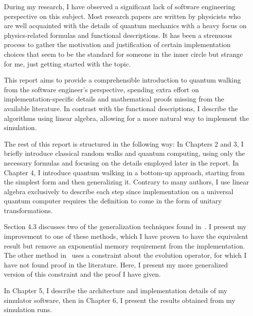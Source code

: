 During my research, I have observed a significant lack of software engineering perspective on this subject. Most research papers are written by physicists who are well acquainted with the details of quantum mechanics with a heavy focus on physics-related formulas and functional descriptions. It has been a strenuous process to gather the motivation and justification of certain implementation choices that seem to be the standard for someone in the inner circle but strange for me, just getting started with the topic.

This report aims to provide a comprehensible introduction to quantum walking from the software engineer's perspective, spending extra effort on implementation-specific details and mathematical proofs missing from the available literature. In contrast with the functional descriptions, I describe the algorithms using linear algebra, allowing for a more natural way to implement the simulation.

The rest of this report is structured in the following way: In Chapters 2 and 3, I briefly introduce classical random walks and quantum computing, using only the necessary formulas and focusing on the details employed later in the report. In Chapter 4, I introduce quantum walking in a bottom-up approach, starting from the simplest form and then generalizing it. Contrary to many authors, I use linear algebra exclusively to describe each step since implementation on a universal quantum computer requires the definition to come in the form of unitary transformations.

Section 4.3 discusses two of the generalization techniques found in~\cite{Portugal}. I present my improvement to one of these methods, which I have proven to have the equivalent result but remove an exponential memory requirement from the implementation. The other method in~\cite{Portugal} uses a constraint about the evolution operator, for which I have not found proof in the literature. Here, I present my more generalized version of this constraint and the proof I have given.

In Chapter 5, I describe the architecture and implementation details of my simulator software, then in Chapter 6, I present the results obtained from my simulation runs.
